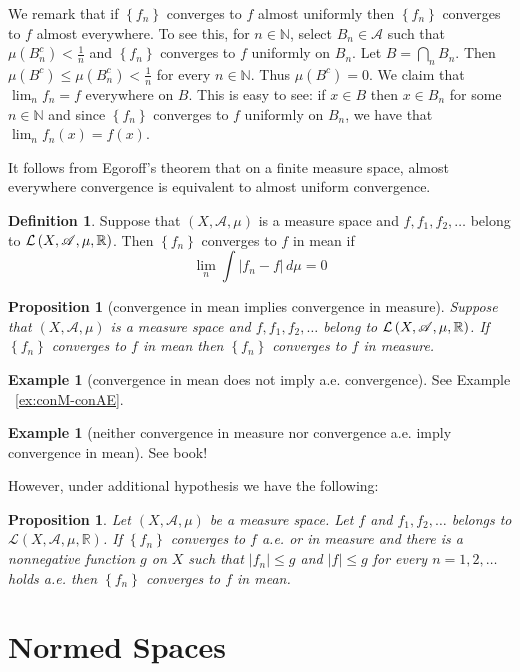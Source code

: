 \documentclass[12pt]{article}
\newtheorem{proposition}[theorem]{Proposition}
\theoremstyle{definition}
\newtheorem{definition}[theorem]{Definition}
\newtheorem{example}[theorem]{Example}
\theoremstyle{remark}
\theoremstyle{plain}
\newcommand{\R}{\mathbb R}
\newcommand{\N}{\mathbb N}
\newcommand{\calL}{{\cal L}}
\newcommand{\scrA}{{\mathscr A}}
\newcommand{\scrL}{{\mathscr L}}
\begin{document}
We remark that if $\left\{ f_n \right\}$ converges to $f$ almost uniformly then $\left\{ f_n \right\}$ converges to $f$ almost everywhere. To see this, for $n\in\N $, select $B_n \in \scrA$ such that $\mu \left( B_n ^c \right) < \frac{1}{n}$ and $\left\{ f_n \right\}$ converges to $f$ uniformly on $B_n$. Let $B=\bigcap_n {B_n}$. Then $\mu (B^c) \le \mu (B_n ^c) < \frac{1}{n} $ for every $n\in\N$. Thus $\mu \left( B^c \right)=0$. We claim that $\lim_n f_n = f$ everywhere on $B$. This is easy to see: if $x\in B$ then $x\in B_n$ for some $n\in\N$ and since $\left\{ f_n \right\}$ converges to $f$ uniformly on $B_n$, we have that $\lim_n f_n \left( x \right) = f\left( x \right)$.

It follows from Egoroff's theorem that on a finite measure space, almost everywhere convergence is equivalent to almost uniform convergence.


\begin{definition}
    Suppose that $\left( X, \scrA , \mu \right)$ is a measure space and $f, f_1,f_2 , \ldots$ belong to $\calL \left( X, \scrA , \mu , \R \right)$. Then $\left\{ f_n \right\}$ converges to $f$ in mean if
    $$\lim_n \int |f_n - f | \, d\mu = 0$$
\end{definition}


\begin{proposition}[convergence in mean implies convergence in measure]
    Suppose that $\left( X, \scrA , \mu \right)$ is a measure space and $f, f_1,f_2 , \ldots$ belong to $\calL \left( X, \scrA , \mu , \R \right)$. If $\left\{ f_n \right\}$ converges to $f$ in mean then $\left\{ f_n \right\}$ converges to $f$ in measure.
\end{proposition}

\begin{example}[convergence in mean does not imply a.e. convergence]
    See Example ~\ref{ex:conM-conAE}. 
\end{example}

\begin{example}[neither convergence in measure nor convergence a.e. imply convergence in mean]
    See book!
\end{example}

However, under additional hypothesis we have the following:

\begin{proposition}
    Let $\left( X, \scrA , \mu \right)$ be a measure space. Let $f$ and $f_1 , f_2 , \ldots$ belongs to $\scrL \left( X , \scrA , \mu , \R \right)$. If $\left\{ f_n \right\}$ converges to $f$ a.e. or in measure and there is a nonnegative function $g$ on $X$ such that $|f_n|\le g$ and $|f|\le g$ for every $n=1,2, \ldots$ holds a.e. then $\left\{ f_n \right\}$ converges to $f$ in mean.
\end{proposition}


\section{Normed Spaces}
\end{document}
